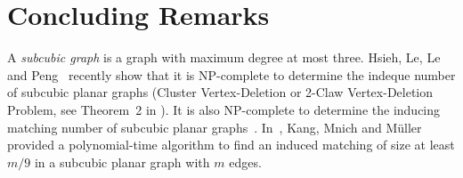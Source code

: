 \documentclass{article}
\begin{document}




\fi

\section{Concluding Remarks}

A {\em subcubic graph} is a graph with maximum degree at most three. Hsieh, Le, Le and Peng~\cite{HLLP} recently show that it is NP-complete to determine the indeque number of subcubic planar graphs (Cluster Vertex-Deletion or 2-Claw Vertex-Deletion Problem, see Theorem~2 in \cite{HLLP}). It is also NP-complete to determine the inducing matching number of subcubic planar graphs~\cite{HOV}. In~\cite{KMM}, Kang, Mnich and M\"uller provided a polynomial-time algorithm to find an induced matching of size at least $m/9$ in a subcubic planar graph with $m$ edges.  
\end{document}
